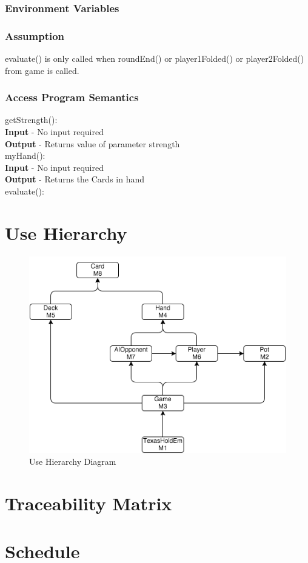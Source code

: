 \documentclass[11pt]{article}
\begin{document}
    \subsubsection{Environment Variables}
    \subsubsection{Assumption}
    evaluate() is only called when roundEnd() or player1Folded() or player2Folded() from game is called.
    \subsubsection{Access Program Semantics}
    getStrength():\\
    \textbf{Input} - No input required\\
    \textbf{Output} - Returns value of parameter strength\\
    myHand():\\
    \textbf{Input} - No input required\\
    \textbf{Output} - Returns the Cards in hand\\
    evaluate():\\
 	
    \section{Use Hierarchy}
    \begin{figure}[h]
		\includegraphics[scale=0.7]{Uses.png}
		\caption{Use Hierarchy Diagram}
		\label{fig1: Figure1}
		\end{figure}
    \section{Traceability Matrix}
    \section{Schedule}
        
    
\end{document}

